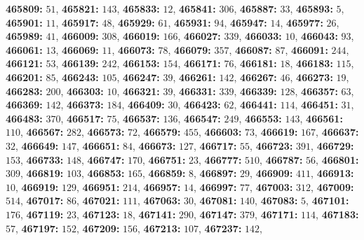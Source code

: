 \textsf{\bfseries 465809:} $51$, \textsf{\bfseries 465821:} $143$, \textsf{\bfseries 465833:} $12$, \textsf{\bfseries 465841:} $306$, \textsf{\bfseries 465887:} $33$, \textsf{\bfseries 465893:} $5$, \textsf{\bfseries 465901:} $11$, \textsf{\bfseries 465917:} $48$, \textsf{\bfseries 465929:} $61$, \textsf{\bfseries 465931:} $94$, \textsf{\bfseries 465947:} $14$, \textsf{\bfseries 465977:} $26$, \textsf{\bfseries 465989:} $41$, \textsf{\bfseries 466009:} $308$, \textsf{\bfseries 466019:} $166$, \textsf{\bfseries 466027:} $339$, \textsf{\bfseries 466033:} $10$, \textsf{\bfseries 466043:} $93$, \textsf{\bfseries 466061:} $13$, \textsf{\bfseries 466069:} $11$, \textsf{\bfseries 466073:} $78$, \textsf{\bfseries 466079:} $357$, \textsf{\bfseries 466087:} $87$, \textsf{\bfseries 466091:} $244$, \textsf{\bfseries 466121:} $53$, \textsf{\bfseries 466139:} $242$, \textsf{\bfseries 466153:} $154$, \textsf{\bfseries 466171:} $76$, \textsf{\bfseries 466181:} $18$, \textsf{\bfseries 466183:} $115$, \textsf{\bfseries 466201:} $85$, \textsf{\bfseries 466243:} $105$, \textsf{\bfseries 466247:} $39$, \textsf{\bfseries 466261:} $142$, \textsf{\bfseries 466267:} $46$, \textsf{\bfseries 466273:} $19$, \textsf{\bfseries 466283:} $200$, \textsf{\bfseries 466303:} $10$, \textsf{\bfseries 466321:} $39$, \textsf{\bfseries 466331:} $339$, \textsf{\bfseries 466339:} $128$, \textsf{\bfseries 466357:} $63$, \textsf{\bfseries 466369:} $142$, \textsf{\bfseries 466373:} $184$, \textsf{\bfseries 466409:} $30$, \textsf{\bfseries 466423:} $62$, \textsf{\bfseries 466441:} $114$, \textsf{\bfseries 466451:} $31$, \textsf{\bfseries 466483:} $370$, \textsf{\bfseries 466517:} $75$, \textsf{\bfseries 466537:} $136$, \textsf{\bfseries 466547:} $249$, \textsf{\bfseries 466553:} $143$, \textsf{\bfseries 466561:} $110$, \textsf{\bfseries 466567:} $282$, \textsf{\bfseries 466573:} $72$, \textsf{\bfseries 466579:} $455$, \textsf{\bfseries 466603:} $73$, \textsf{\bfseries 466619:} $167$, \textsf{\bfseries 466637:} $32$, \textsf{\bfseries 466649:} $147$, \textsf{\bfseries 466651:} $84$, \textsf{\bfseries 466673:} $127$, \textsf{\bfseries 466717:} $55$, \textsf{\bfseries 466723:} $391$, \textsf{\bfseries 466729:} $153$, \textsf{\bfseries 466733:} $148$, \textsf{\bfseries 466747:} $170$, \textsf{\bfseries 466751:} $23$, \textsf{\bfseries 466777:} $510$, \textsf{\bfseries 466787:} $56$, \textsf{\bfseries 466801:} $309$, \textsf{\bfseries 466819:} $103$, \textsf{\bfseries 466853:} $165$, \textsf{\bfseries 466859:} $8$, \textsf{\bfseries 466897:} $29$, \textsf{\bfseries 466909:} $411$, \textsf{\bfseries 466913:} $10$, \textsf{\bfseries 466919:} $129$, \textsf{\bfseries 466951:} $214$, \textsf{\bfseries 466957:} $14$, \textsf{\bfseries 466997:} $77$, \textsf{\bfseries 467003:} $312$, \textsf{\bfseries 467009:} $514$, \textsf{\bfseries 467017:} $86$, \textsf{\bfseries 467021:} $111$, \textsf{\bfseries 467063:} $30$, \textsf{\bfseries 467081:} $140$, \textsf{\bfseries 467083:} $5$, \textsf{\bfseries 467101:} $176$, \textsf{\bfseries 467119:} $23$, \textsf{\bfseries 467123:} $18$, \textsf{\bfseries 467141:} $290$, \textsf{\bfseries 467147:} $379$, \textsf{\bfseries 467171:} $114$, \textsf{\bfseries 467183:} $57$, \textsf{\bfseries 467197:} $152$, \textsf{\bfseries 467209:} $156$, \textsf{\bfseries 467213:} $107$, \textsf{\bfseries 467237:} $142$, 
